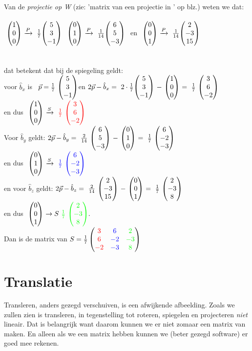  \\ 

Van de \textit{projectie op W}  (zie:  'matrix van een projectie in \RD' op blz.\pageref{projectieR3}) weten we dat:\\ \\
$ \ \vecdrie{1}{0}{0}   \  \xrightarrow{P}  \  \frac{1}{7}\vecdrie {5 } {3}{-1} $
\quad   $ \ \vecdrie{0}{1}{0}   \  \xrightarrow{P}  \ \frac{1}{14}  \vecdrie{ 6 }{5 }{-3 }\ $ 
en \quad  
$  \ \vecdrie{0}{0}{1}   \  \xrightarrow{P}  \  \frac{1}{14}  \vecdrie{2 }{-3 }{15}\ $\\ \\ \\
dat betekent dat bij de spiegeling geldt:\\
voor $ \hat{b}_x $ is \  
$\vec{p} =  \frac{1}{7} \ \vecdrie {5 } {3}{-1} $\quad  en \quad 
$ 2\vec{p}  -  \hat{b}_x  = 
\ 2 \cdot  \frac{1}{7} \vecdrie {5 } {3}{-1} \  - \  \vecdrie{1}{0}{0}  \ =
\   \frac{1}{7} \ \vecdrie {3 } {6}{-2} $ \\en dus 
$ \ \vecdrie{1}{0}{0}   \  \xrightarrow{S}  \  { \color{red}\frac{1}{7}} \  \vecdrie[red] {3 } {6}{-2} $\\
Voor $ \hat{b}_y  $ geldt:
$ 2\vec{p}  -  \hat{b}_y  =  
\ \frac{2}{14} \ \vecdrie {6 } {5}{-3} \  - \  \vecdrie{0}{1}{0}  \ = 
\   \frac{1}{7} \ \vecdrie {6 } {-2}{-3} $  \\ en dus  \quad 
$ \ \vecdrie{0}{1}{0}   \  \xrightarrow{S}  \  { \color{blue}\frac{1}{7}} \  \vecdrie[blue] {6 } {-2}{-3} $\\
en voor $ \hat{b}_z  $ geldt:
$ 2\vec{p}  -  \hat{b}_z  =  
\ \frac{2}{14} \ \vecdrie {2 } {-3}{15} \  - \  \vecdrie{0}{0}{1}  \ = 
\   \frac{1}{7} \ \vecdrie {2 } {-3}{8} $   \\ en dus 
$ \ \vecdrie{0}{0}{1}   \  \rightarrow{S}  \  { \color{green}\frac{1}{7}} \  \vecdrie[green] {2} {-3}{8}. $\\
Dan is de matrix van 
$ S = 
\frac{1}{7} \begin{pmatrix}   {\color{red}3} &  {\color{blue}6} &   {\color{green}2}  \\    {\color{red}6}   &   {\color{blue}-2} &  {\color{green}-3}  \\   {\color{red}-2} &   {\color{blue}-3}  &   {\color{green}8} \end{pmatrix} $

\section{Translatie}		
Transleren, anders gezegd verschuiven, is een afwijkende afbeelding. Zoals we zullen zien is transleren, in tegenstelling tot roteren, spiegelen en projecteren \textit{niet} lineair. Dat is belangrijk want daarom kunnen we er niet zomaar een matrix van maken. En alleen als we een matrix hebben kunnen we (beter gezegd software) er  goed mee rekenen. 

